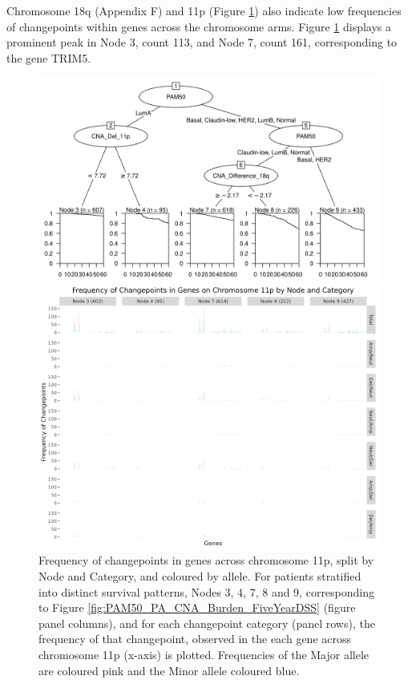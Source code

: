 Chromosome 18q (Appendix F) and 11p (Figure \ref{fig:Barplot_11p}) also indicate low frequencies of changepoints within genes across the chromosome arms. Figure \ref{fig:Barplot_11p} displays a prominent peak in Node 3, count 113, and Node 7, count 161, corresponding to the gene TRIM5. 

\begin{figure}[!htp]
\centering

\includegraphics[width=1\textwidth]{../figures/Chapter_3/PA_PartyKit_Survival_Burden_FiveYearDSS_PAM50.png}

\vspace{0.5cm}

\includegraphics[width = 1\textwidth]{../figures/Chapter_6/Chromosome_11p_Barplot_Node.png}
\caption[Frequency of changepoints in genes across chromosome 11p, split by Node and Category, and coloured by allele.]{Frequency of changepoints in genes across chromosome 11p, split by Node and Category, and coloured by allele. For patients stratified into distinct survival patterns, Nodes 3, 4, 7, 8 and 9, corresponding to Figure \ref{fig:PAM50_PA_CNA_Burden_FiveYearDSS} (figure panel columns), and for each changepoint category (panel rows), the frequency of that changepoint, observed in the each gene across chromosome 11p (x-axis) is plotted. Frequencies of the Major allele are coloured pink and the Minor allele coloured blue.}
\label{fig:Barplot_11p}
\end{figure}

